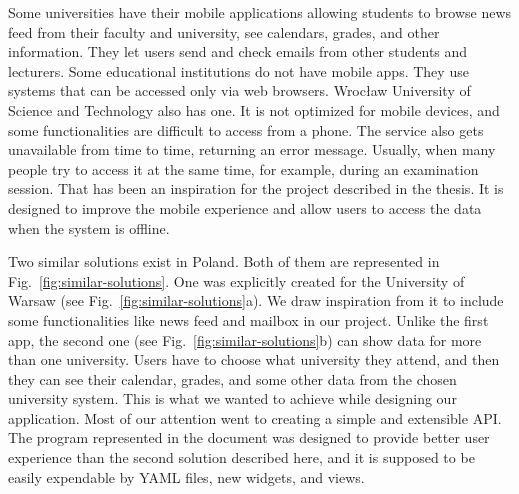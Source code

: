 Some universities have their mobile applications allowing students to browse news feed from their faculty and university, see calendars, grades, and other information. They let users send and check emails from other students and lecturers. Some educational institutions do not have mobile apps. They use systems that can be accessed only via web browsers. Wrocław University of Science and Technology also has one. It is not optimized for mobile devices, and some functionalities are difficult to access from a phone. The service also gets unavailable from time to time, returning an error message. Usually, when many people try to access it at the same time, for example, during an examination session. That has been an inspiration for the project described in the thesis. It is designed to improve the mobile experience and allow users to access the data when the system is offline.


Two similar solutions exist in Poland. Both of them are represented in Fig.~\ref{fig:similar-solutions}. One was explicitly created for the University of Warsaw (see Fig.~\ref{fig:similar-solutions}a). We draw inspiration from it to include some functionalities like news feed and mailbox in our project. Unlike the first app, the second one (see Fig.~\ref{fig:similar-solutions}b) can show data for more than one university. Users have to choose what university they attend, and then they can see their calendar, grades, and some other data from the chosen university system. This is what we wanted to achieve while designing our application. Most of our attention went to creating a simple and extensible API. The program represented in the document was designed to provide better user experience than the second solution described here, and it is supposed to be easily expendable by YAML files, new widgets, and views.

